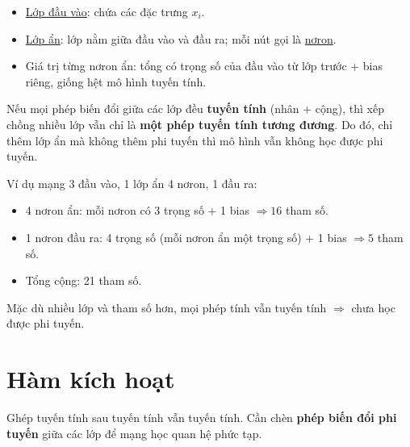 \documentclass[12pt,a4paper]{article}
\begin{document}
\begin{dinhnghia}[title={Lớp ẩn và nơron}]
\begin{itemize}
  \item \href{https://developers.google.com/machine-learning/glossary\#input-layer}{Lớp đầu vào}: chứa các đặc trưng $x_i$.
  \item \href{https://developers.google.com/machine-learning/glossary\#hidden_layer}{Lớp ẩn}: lớp nằm giữa đầu vào và đầu ra; mỗi nút gọi là \href{https://developers.google.com/machine-learning/glossary\#neuron}{nơron}.
  \item Giá trị từng nơron ẩn: tổng có trọng số của đầu vào từ lớp trước + bias riêng, giống hệt mô hình tuyến tính.
\end{itemize}
\end{dinhnghia}

\begin{ynghia}[title={Thêm lớp ẩn có giúp phi tuyến?}]
Nếu mọi phép biến đổi giữa các lớp đều \textbf{tuyến tính} (nhân + cộng), thì xếp chồng nhiều lớp vẫn chỉ là \textbf{một phép tuyến tính tương đương}. Do đó, chỉ thêm lớp ẩn mà không thêm phi tuyến thì mô hình vẫn không học được phi tuyến.
\end{ynghia}

\begin{luuy}[title={Số tham số}]
Ví dụ mạng 3 đầu vào, 1 lớp ẩn 4 nơron, 1 đầu ra:
\begin{itemize}
  \item 4 nơron ẩn: mỗi nơron có 3 trọng số + 1 bias $\Rightarrow 16$ tham số.
  \item 1 nơron đầu ra: 4 trọng số (mỗi nơron ẩn một trọng số) + 1 bias $\Rightarrow 5$ tham số.
  \item Tổng cộng: 21 tham số.
\end{itemize}
Mặc dù nhiều lớp và tham số hơn, mọi phép tính vẫn tuyến tính $\Rightarrow$ chưa học được phi tuyến.
\end{luuy}

\section{Hàm kích hoạt}

\begin{dongco}[title={Làm sao đưa phi tuyến vào mạng?}]
Ghép tuyến tính sau tuyến tính vẫn tuyến tính. Cần chèn \textbf{phép biến đổi phi tuyến} giữa các lớp để mạng học quan hệ phức tạp.
\end{dongco}
\end{document}
